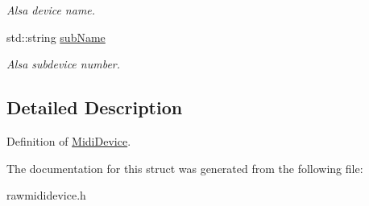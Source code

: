 \begin{DoxyCompactItemize}
\begin{DoxyCompactList}\small\item\em Alsa device name. \end{DoxyCompactList}\item 
\hypertarget{structNl_1_1MidiDevice_abc6e7b562234d7ca95201f18cdf837f4}{std\-::string \hyperlink{structNl_1_1MidiDevice_abc6e7b562234d7ca95201f18cdf837f4}{sub\-Name}}\label{structNl_1_1MidiDevice_abc6e7b562234d7ca95201f18cdf837f4}

\begin{DoxyCompactList}\small\item\em Alsa subdevice number. \end{DoxyCompactList}\end{DoxyCompactItemize}


\subsection{Detailed Description}
Definition of \hyperlink{structNl_1_1MidiDevice}{Midi\-Device}. 

The documentation for this struct was generated from the following file\-:\begin{DoxyCompactItemize}
\item 
rawmididevice.\-h\end{DoxyCompactItemize}
